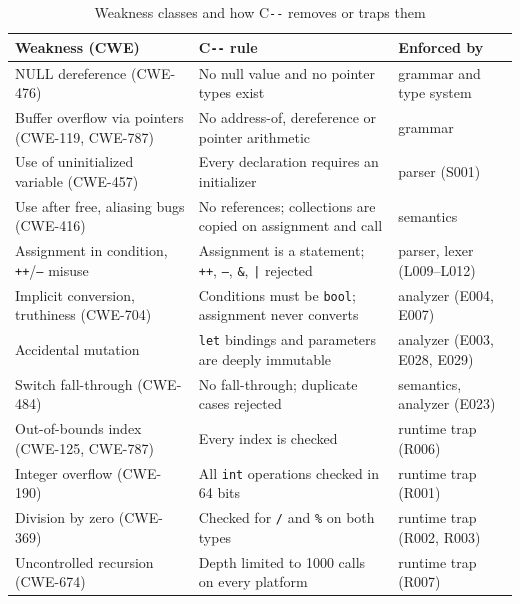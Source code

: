 \documentclass[conference]{IEEEtran}
\newcommand{\cmm}{C\texttt{-{}-}}
\begin{document}
\begin{table}[t]
\caption{Weakness classes and how \cmm{} removes or traps them}
\label{tab:hazards}
\centering
\footnotesize
\begin{tabular}{@{}>{\raggedright\arraybackslash}p{4.4cm} >{\raggedright\arraybackslash}p{8.2cm} >{\raggedright\arraybackslash}p{3.6cm}@{}}
\toprule
\textbf{Weakness (CWE)} & \textbf{\cmm{} rule} & \textbf{Enforced by} \\
\midrule
NULL dereference (CWE-476) & No null value and no pointer types exist & grammar and type system \\
Buffer overflow via pointers (CWE-119, CWE-787) & No address-of, dereference or pointer arithmetic & grammar \\
Use of uninitialized variable (CWE-457) & Every declaration requires an initializer & parser (S001) \\
Use after free, aliasing bugs (CWE-416) & No references; collections are copied on assignment and call & semantics \\
Assignment in condition, \texttt{++}/\texttt{--} misuse & Assignment is a statement; \texttt{++}, \texttt{--}, \texttt{\&}, \texttt{|} rejected & parser, lexer (L009--L012) \\
Implicit conversion, truthiness (CWE-704) & Conditions must be \texttt{bool}; assignment never converts & analyzer (E004, E007) \\
Accidental mutation & \texttt{let} bindings and parameters are deeply immutable & analyzer (E003, E028, E029) \\
Switch fall-through (CWE-484) & No fall-through; duplicate cases rejected & semantics, analyzer (E023) \\
\midrule
Out-of-bounds index (CWE-125, CWE-787) & Every index is checked & runtime trap (R006) \\
Integer overflow (CWE-190) & All \texttt{int} operations checked in 64 bits & runtime trap (R001) \\
Division by zero (CWE-369) & Checked for \texttt{/} and \texttt{\%} on both types & runtime trap (R002, R003) \\
Uncontrolled recursion (CWE-674) & Depth limited to 1000 calls on every platform & runtime trap (R007) \\
\bottomrule
\end{tabular}
\end{table}
\end{document}

